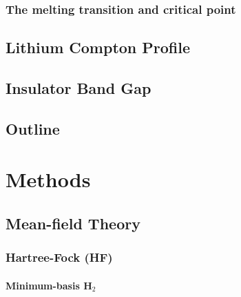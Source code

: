 \documentclass[draftthesis,fullpage]{uiucthesis}
\begin{document}
\subsection{The melting transition and critical point}
\section{Lithium Compton Profile}
\section{Insulator Band Gap}
\section{Outline}

\chapter{Methods}
\section{Mean-field Theory}
\subsection{Hartree-Fock (HF)}

\newcommand{\hcore}{H^{\text{core}}_{\mu\nu}}

\subsubsection{Minimum-basis H$_2$}
\end{document}
